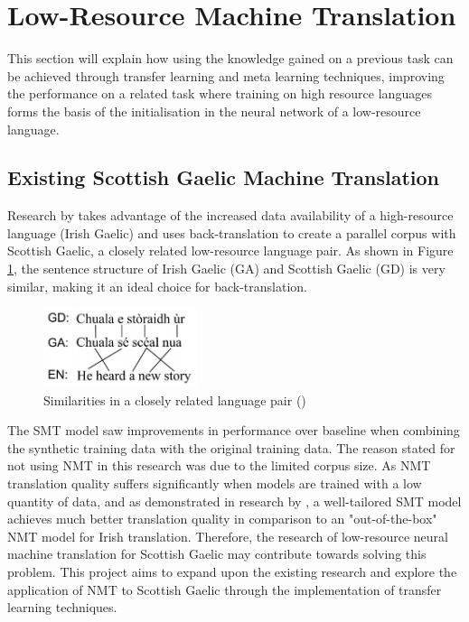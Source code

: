 \section{Low-Resource Machine Translation}
\label{sec:2-low_resource_approaches}
This section will explain how using the knowledge gained on a previous task can be achieved through transfer learning and meta learning techniques, improving the performance on a related task where training on high resource languages forms the basis of the initialisation in the neural network of a low-resource language.

\subsection{Existing Scottish Gaelic Machine Translation}

Research by \cite{dowling_leveraging_2019} takes advantage of the increased data availability of a high-resource language (Irish Gaelic) and uses back-translation to create a parallel corpus with Scottish Gaelic, a closely related low-resource language pair. As shown in Figure \ref{fig:lang_pair}, the sentence structure of Irish Gaelic (GA) and Scottish Gaelic (GD) is very similar, making it an ideal choice for back-translation.

\begin{figure}[ht!]
\centering
\includegraphics[width=0.4\textwidth]{media/literature/nmt_approaches/lr_gaelic.png}
\caption[Diagram of the similarities in a closely related language pair]{Similarities in a closely related language pair (\cite{dowling_leveraging_2019})}
\label{fig:lang_pair}
\end{figure}


The \acrshort{SMT} model saw improvements in performance over baseline when combining the synthetic training data with the original training data. The reason stated for not using \acrshort{NMT} in this research was due to the limited corpus size. As \acrshort{NMT} translation quality suffers significantly when models are trained with a low quantity of data, and as demonstrated in research by \cite{dowling_smt_2018}, a well-tailored \acrshort{SMT} model achieves much better translation quality in comparison to an "out-of-the-box" \acrshort{NMT} model for Irish translation. Therefore, the research of low-resource neural machine translation for Scottish Gaelic may contribute towards solving this problem. This project aims to expand upon the existing research and explore the application of \acrshort{NMT} to Scottish Gaelic through the implementation of transfer learning techniques.

